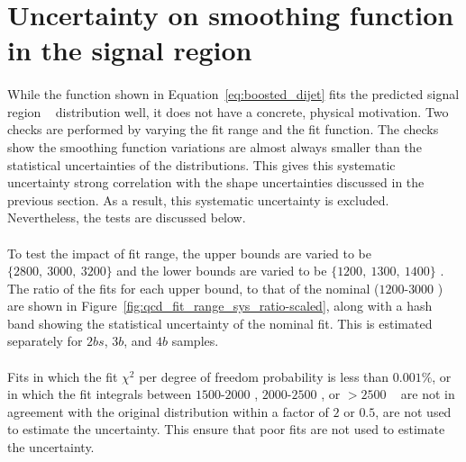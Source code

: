 \section{Uncertainty on smoothing function in the signal region}
\label{unc-smooth-qcd-in-sr}

\paragraph{} 
While the function shown in Equation~\ref{eq:boosted_dijet} fits the predicted signal region \mtwoJ~ distribution well, it does not have a concrete, physical motivation.
Two checks are performed by varying the fit range and the fit function.
The checks show the smoothing function variations are almost always smaller than the statistical uncertainties of the distributions.
This gives this systematic uncertainty strong correlation with the shape uncertainties discussed in the previous section.
As a result, this systematic uncertainty is excluded.
Nevertheless, the tests are discussed below.

\paragraph{}
To test the impact of fit range, the upper bounds are varied to be $\{2800,\ 3000,\ 3200\}$ \GeV and the lower bounds are varied to be $\{1200,\ 1300,\ 1400\}$ \GeV.  
The ratio of the fits for each upper bound, to that of the nominal ($1200$-$3000$ \GeV) are shown in Figure~\ref{fig:qcd_fit_range_sys_ratio-scaled}, along with a hash band showing the statistical uncertainty of the nominal fit.
This is estimated separately for $2bs$, $3b$, and $4b$ samples.

\paragraph{}
Fits in which the fit $\chi^2$ per degree of freedom probability is less than $0.001\%$, or in which the fit integrals between $1500$-$2000$ \GeV, $2000$-$2500$ \GeV, or $>2500$ \GeV~ are not in agreement with the original distribution within a factor of $2$ or $0.5$, are not used to estimate the uncertainty. This ensure that poor fits are not used to estimate the uncertainty.

